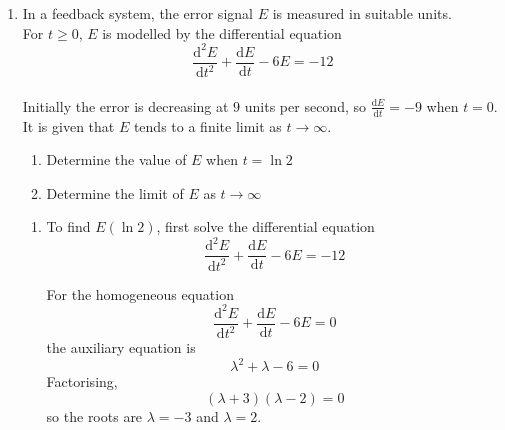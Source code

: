 \documentclass[leqno]{article}
\newcommand{\questionitem}{%
  \item\phantomsection
  \addcontentsline{toc}{section}{Question \number\value{enumi}}%
}
\begin{document}
\begin{enumerate}[
  label=\textbf{\arabic*.},
  leftmargin=*,
  topsep=0pt,
  partopsep=0pt,
  parsep=0pt
]
\begin{tcolorbox}[colback=white, colframe=scarlet, title={\textbf{Solution}}, breakable, grow to left by=6mm, grow to right by=10mm]
\begin{enumerate}[label=\textbf{(\alph*)}]
So the distance from the left-hand end is
\begin{align*}
1.2+x(4.5)&\approx 1.2-0.0369\\
&\approx 1.163
\end{align*}

Hence, the trolley is approximately $1.163\,\text{m}$ from the left-hand end of the track.

  \item One limitation is that the model assumes the spring force is proportional to displacement and the damping force is proportional to velocity.
\end{enumerate}
\end{tcolorbox}


\newpage

\questionitem

In a feedback system, the error signal $E$ is measured in suitable units. \\

For $t\ge 0$, $E$ is modelled by the differential equation
\[\frac{\mathrm{d}^2 E}{\mathrm{d} t^2}+\frac{\mathrm{d} E}{\mathrm{d} t}-6E=-12\] \\
Initially the error is decreasing at $9$ units per second, so $\frac{\mathrm{d} E}{\mathrm{d} t}=-9$ when $t=0$. It is given that $E$ tends to a finite limit as $t\to\infty$. \\

\begin{enumerate}[label=\textbf{(\alph*)}]
  \item Determine the value of $E$ when $t=\ln 2$  \\
  \item Determine the limit of $E$ as $t\to\infty$  \\
\end{enumerate}

\vspace*{30pt}

\begin{tcolorbox}[colback=white, colframe=scarlet, title={\textbf{Solution}}, breakable, grow to left by=6mm, grow to right by=10mm]
\begin{enumerate}[label=\textbf{(\alph*)}]
  \item To find $E(\ln 2)$, first solve the differential equation
  \[
  \frac{\mathrm{d}^2E}{\mathrm{d}t^2}+\frac{\mathrm{d}E}{\mathrm{d}t}-6E=-12
  \]

  For the homogeneous equation
  \[
  \frac{\mathrm{d}^2E}{\mathrm{d}t^2}+\frac{\mathrm{d}E}{\mathrm{d}t}-6E=0
  \]
  the auxiliary equation is
  \[
  \lambda^2+\lambda-6=0
  \]
  Factorising,
  \[
  (\lambda+3)(\lambda-2)=0
  \]
  so the roots are $\lambda=-3$ and $\lambda=2$.


\end{enumerate}
\end{tcolorbox}
\end{enumerate}
\end{document}
